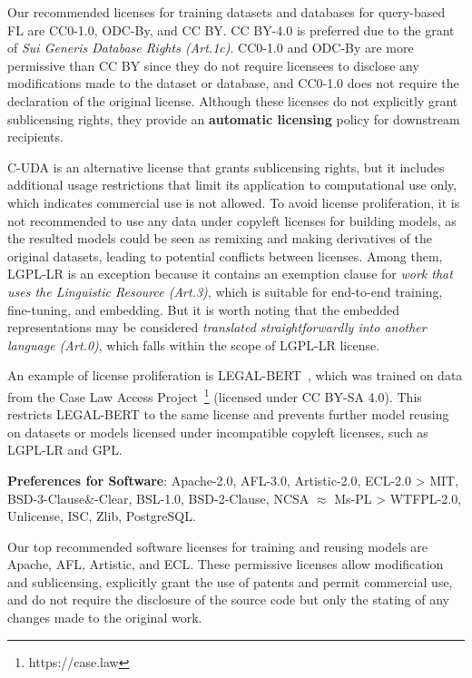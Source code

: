   Our recommended licenses for training datasets and databases for query-based FL are CC0-1.0, ODC-By, and CC BY. CC BY-4.0 is preferred due to the grant of \textit{Sui Generis Database Rights (Art.1c)}. 
  CC0-1.0 and ODC-By are more permissive than CC BY since they do not require licensees to disclose any modifications made to the dataset or database, and CC0-1.0 does not require the declaration of the original license. 
  Although these licenses do not explicitly grant sublicensing rights, they provide an \textbf{automatic licensing} policy for downstream recipients.
  
  C-UDA is an alternative license that grants sublicensing rights, but it includes additional usage restrictions that limit its application to computational use only, which indicates commercial use is not allowed.
  To avoid license proliferation, it is not recommended to use any data under copyleft licenses for building models, as the resulted models could be seen as remixing and making derivatives of the original datasets, leading to potential conflicts between licenses.
  Among them, LGPL-LR is an exception because it contains an exemption clause for \textit{work that uses the Linguistic Resource (Art.3)}, which is suitable for end-to-end training, fine-tuning, and embedding. 
  But it is worth noting that the embedded representations may be considered \textit{translated straightforwardly into another language (Art.0)}, which falls within the scope of LGPL-LR license.
  
  An example of license proliferation is LEGAL-BERT~\cite{chalkidis2020legal}, which was trained on data from the Case Law Access Project~\footnote{https://case.law} (licensed under CC BY-SA 4.0). This restricts LEGAL-BERT to the same license and prevents further model reusing on datasets or models licensed under incompatible copyleft licenses, such as LGPL-LR and GPL.

  \textbf{Preferences for Software}: Apache-2.0, AFL-3.0, Artistic-2.0, ECL-2.0 > MIT, BSD-3-Clause\&-Clear, BSL-1.0, BSD-2-Clause, NCSA $\approx$ Ms-PL > WTFPL-2.0, Unlicense, ISC, Zlib, PostgreSQL.
  
  Our top recommended software licenses for training and reusing models are Apache, AFL, Artistic, and ECL.
  These permissive licenses allow modification and sublicensing, explicitly grant the use of patents and permit commercial use, and do not require the disclosure of the source code but only the stating of any changes made to the original work.

